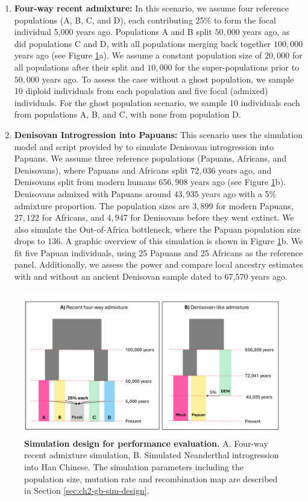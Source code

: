 \begin{enumerate}
    \item \textbf{Four-way recent admixture:} In this scenario, we assume four reference populations (A, B, C, and D), each contributing 25\% to form the focal individual 5,000 years ago. Populations A and B split $50{,}000$ years ago, as did populations C and D, with all populations merging back together $100{,}000$ years ago (see Figure \ref{fig:sim1}a). We assume a constant population size of $20{,}000$ for all populations after their split and $10{,}000$ for the super-populations prior to $50{,}000$ years ago. To assess the case without a ghost population, we sample 10 diploid individuals from each population and five focal (admixed) individuals. For the ghost population scenario, we sample 10 individuals each from populations A, B, and C, with none from population D.
    
    \item \textbf{Denisovan Introgression into Papuans:} This scenario uses the simulation model and script provided by \cite{skov2018detecting} to simulate Denisovan introgression into Papuans. We assume three reference populations (Papuans, Africans, and Denisovans), where Papuans and Africans split $72{,}036$ years ago, and Denisovans split from modern humans $656{,}908$ years ago (see Figure \ref{fig:sim1}b). Denisovans admixed with Papuans around $43{,}935$ years ago with a 5\% admixture proportion. The population sizes are $3,899$ for modern Papuans, $27{,}122$ for Africans, and $4{,}947$ for Denisovans before they went extinct. We also simulate the Out-of-Africa bottleneck, where the Papuan population size drops to $136$. A graphic overview of this simulation is shown in Figure \ref{fig:sim1}b. We fit five Papuan individuals, using 25 Papuans and 25 Africans as the reference panel. Additionally, we assess the power and compare local ancestry estimates with and without an ancient Denisovan sample dated to 67,570 years ago.
\end{enumerate}

\begin{figure}
    \centering
    \includegraphics[width=\textwidth]{figures/thesis_gb_sim_design.pdf}
    \caption{\textbf{Simulation design for performance evaluation.} A. Four-way recent admixture simulation, B. Simulated Neanderthal introgression into Han Chinese. The simulation parameters including the population size, mutation rate and recombination map are described in Section \ref{sec:ch2-gb-sim-design}.}
    \label{fig:sim1}
\end{figure}

